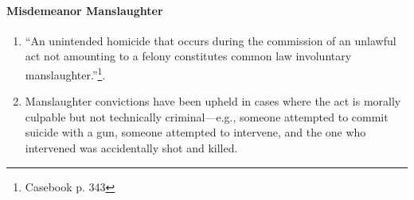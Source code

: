 \paragraph{Misdemeanor Manslaughter}

\begin{enumerate}
    \item ``An unintended homicide that occurs during the commission of an unlawful act not amounting to a felony constitutes common law involuntary manslaughter.''\footnote{Casebook p. 343}.
    \item Manslaughter convictions have been upheld in cases where the act is morally culpable but not technically criminal---e.g., someone attempted to commit suicide with a gun, someone attempted to intervene, and the one who intervened was accidentally shot and killed.
\end{enumerate}
